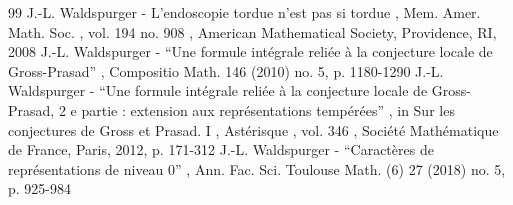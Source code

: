 \documentclass[11pt]{article}
\numberwithin{equation}{section}\providecommand{\og}{«\,}\providecommand{\fg}{\,»}
\begin{document}
\begin{thebibliography}{99}
 J.-L. Waldspurger - L’endoscopie tordue n’est pas si tordue , Mem. Amer. Math. Soc. , vol. 194 no. 908 , American Mathematical Society, Providence, RI, 2008
 J.-L. Waldspurger - “Une formule intégrale reliée à la conjecture locale de Gross-Prasad” , Compositio Math. 146 (2010) no. 5, p. 1180-1290
 J.-L. Waldspurger - “Une formule intégrale reliée à la conjecture locale de Gross-Prasad, 2 e partie : extension aux représentations tempérées” , in Sur les conjectures de Gross et Prasad. I , Astérisque , vol. 346 , Société Mathématique de France, Paris, 2012, p. 171-312
 J.-L. Waldspurger - “Caractères de représentations de niveau 0” , Ann. Fac. Sci. Toulouse Math. (6) 27 (2018) no. 5, p. 925-984
\end{thebibliography}
\end{document}
